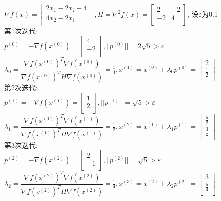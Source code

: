 \begin{solution}
    $\nabla f(x)=\begin{bmatrix}
        2x_1-2x_2-4  \\
        4x_2-2x_1  \\
    \end{bmatrix}, H=\nabla^2 f(x)=\begin{bmatrix}
        2   & -2  \\
        -2  & 4  \\
    \end{bmatrix}$,
    设$\varepsilon$为0.1\\
    第1次迭代:\\
    $p^{(0)}=-\nabla f(x^{(0)})=\begin{bmatrix} 4\\-2\\\end{bmatrix},||p^{(0)}||=2\sqrt{5}>\varepsilon$\\
    $\lambda_0=\dfrac{\nabla f(x^{(0)})^T\nabla f(x^{(0)})}{\nabla f(x^{(0)})^TH\nabla f(x^{(0)})}=\frac{1}{4},x^{(1)}=x^{(0)}+\lambda_0p^{(0)}=\begin{bmatrix} 2\\\frac{1}{2}\\\end{bmatrix}$\\
    第2次迭代:\\
    $p^{(1)}=-\nabla f(x^{(1)})=\begin{bmatrix} 1\\2\\\end{bmatrix},||p^{(1)}||=\sqrt{5}>\varepsilon$\\
    $\lambda_1=\dfrac{\nabla f(x^{(1)})^T\nabla f(x^{(1)})}{\nabla f(x^{(1)})^TH\nabla f(x^{(1)})}=\frac{1}{2},x^{(2)}=x^{(1)}+\lambda_1p^{(1)}=\begin{bmatrix} \frac{5}{2}\\\frac{3}{2}\\\end{bmatrix}$\\
    第3次迭代:\\
    $p^{(2)}=-\nabla f(x^{(2)})=\begin{bmatrix} 2\\-1\\\end{bmatrix},||p^{(2)}||=\sqrt{5}>\varepsilon$\\
    $\lambda_2=\dfrac{\nabla f(x^{(2)})^T\nabla f(x^{(2)})}{\nabla f(x^{(2)})^TH\nabla f(x^{(2)})}=\frac{1}{4},x^{(3)}=x^{(2)}+\lambda_2p^{(2)}=\begin{bmatrix} 3\\\frac{5}{4}\\\end{bmatrix}$\\

\end{solution}
